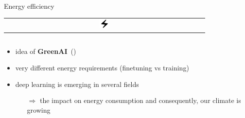 \documentclass[compress,aspectratio=169]{beamer}
\begin{document}
\begin{frame}{Energy efficiency 
              \begin{tabular}{@{}c@{}}
                  \includegraphics[width=0.05\textwidth]{assets/electric_bolt_FILL0_wght400_GRAD0_opsz48}
              \end{tabular}
              }



    \begin{columns}
        
        \begin{column}{0.6\textwidth}
            \begin{itemize}
                \item idea of \textbf{GreenAI}~(\cite{schwartz_2019_greenai})\\[1em]
                \item very different energy requirements (finetuning vs training)\\[1em]
                \item deep learning is emerging in several fields
                    \begin{itemize}
                        \item[$\Rightarrow$] the impact on energy consumption and consequently, our climate is growing
                    \end{itemize}
            \end{itemize}
        \end{column}


\end{columns}
\end{frame}
\end{document}
